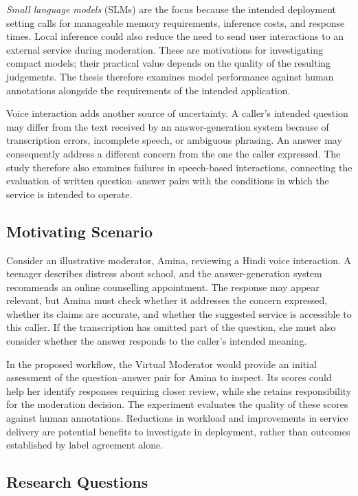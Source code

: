 \documentclass[11pt,a4paper]{article}
\begin{document}
\emph{Small language models} (SLMs) are the focus because the intended
deployment setting calls for manageable memory requirements, inference costs,
and response times. Local inference could also reduce the need to send user
interactions to an external service during moderation. These are motivations
for investigating compact models; their practical value depends on the
quality of the resulting judgements. The thesis therefore examines model
performance against human annotations alongside the requirements of the
intended application.

Voice interaction adds another source of uncertainty. A caller's intended
question may differ from the text received by an answer-generation system
because of transcription errors, incomplete speech, or ambiguous phrasing.
An answer may consequently address a different concern from the one the
caller expressed. The study therefore also examines failures in speech-based
interactions, connecting the evaluation of written question--answer pairs
with the conditions in which the service is intended to operate.

\subsection{Motivating Scenario}

Consider an illustrative moderator, Amina, reviewing a Hindi voice interaction.
A teenager describes distress about school, and the answer-generation system
recommends an online counselling appointment. The response may appear relevant,
but Amina must check whether it addresses the concern expressed, whether its
claims are accurate, and whether the suggested service is accessible to this
caller. If the transcription has omitted part of the question, she must also
consider whether the answer responds to the caller's intended meaning.

In the proposed workflow, the Virtual Moderator would provide an initial
assessment of the question--answer pair for Amina to inspect. Its scores could
help her identify responses requiring closer review, while she retains
responsibility for the moderation decision. The experiment evaluates the
quality of these scores against human annotations. Reductions in workload
and improvements in service delivery are potential benefits to investigate
in deployment, rather than outcomes established by label agreement alone.

\subsection{Research Questions}
\end{document}
